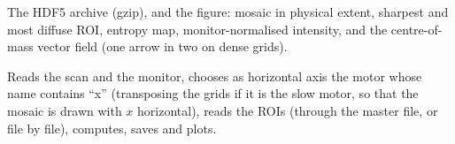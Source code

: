 The HDF5 archive (gzip), and the figure: mosaic in physical extent, sharpest and most diffuse
ROI, entropy map, monitor-normalised intensity, and the centre-of-mass vector field (one arrow
in two on dense grids).

Reads the scan and the monitor, chooses as horizontal axis the motor whose name contains
``x'' (transposing the grids if it is the slow motor, so that the mosaic is drawn with $x$
horizontal), reads the ROIs (through the master file, or file by file), computes, saves and
plots.
